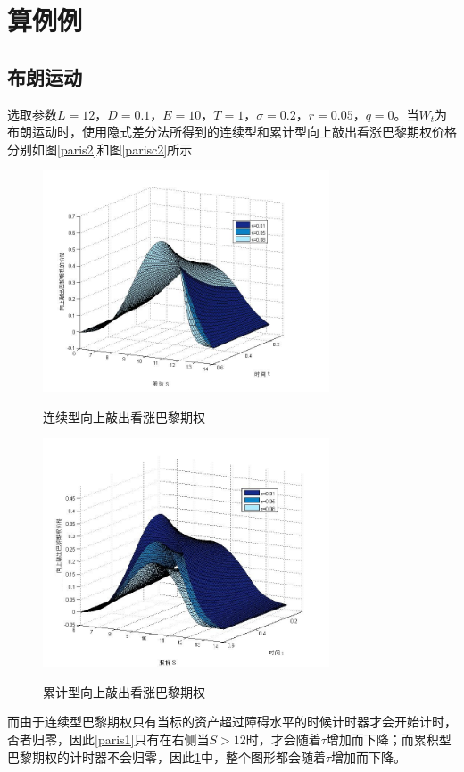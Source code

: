 \documentclass{ctexart} %
\begin{document}
\section{算例例}
\subsection{布朗运动}
选取参数$L=12$，$D=0.1$，$E=10$，$T=1$，$\sigma=0.2$，$r=0.05$，$q=0$。当$W_t$为布朗运动时，使用隐式差分法所得到的连续型和累计型向上敲出看涨巴黎期权价格分别如图\ref{paris2}和图\ref{parisc2}所示
\iffalse
\begin{figure}[H]
\begin{minipage}{0.48\linewidth}
\label{paris1}
\includegraphics[width=8.5cm]{code/paris1.jpg}
\caption{连续型向上敲出看涨巴黎期权}
\end{minipage}
\begin{minipage}{0.48\linewidth}
\label{parisc1}
\includegraphics[width=8.5cm]{code/parisc1.jpg}
\caption{累计型向上敲出看涨巴黎期权}
\end{minipage}
\end{figure}
而由于连续型巴黎期权只有当标的资产超过障碍水平的时候计时器才会开始计时，否者归零，因此\ref{paris1}只有在右侧当$S>12$时，才会随着$\tau$增加而下降；而累积型巴黎期权的计时器不会归零，因此\ref{parisc1}中，整个图形都会随着$\tau$增加而下降。
\end{document}

